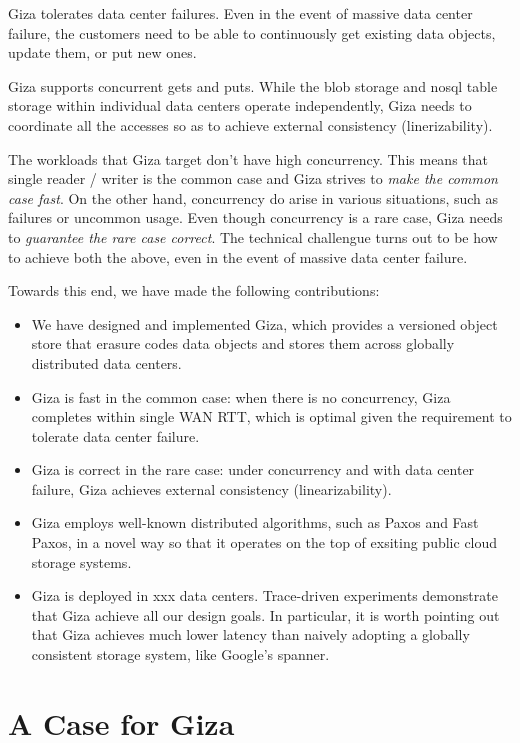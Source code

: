 Giza tolerates data center failures. Even in the event of massive data center failure, the customers need to be able to continuously get existing data objects, update them, or put new ones.

Giza supports concurrent gets and puts. While the blob storage and nosql table storage within individual data centers operate independently, Giza needs to coordinate all the accesses so as to achieve external consistency (linerizability).

The workloads that Giza target don't have high concurrency. This means that single reader / writer is the common case and Giza strives to {\em make the common case fast}. On the other hand, concurrency do arise in various situations, such as failures or uncommon usage. Even though concurrency is a rare case, Giza needs to {\em guarantee the rare case correct}. The technical challengue turns out to be how to achieve both the above, even in the event of massive data center failure.

Towards this end, we have made the following contributions:
\begin{itemize}
    \item We have designed and implemented Giza, which provides a versioned object store that erasure codes data objects and stores them across globally distributed data centers.
    \item Giza is fast in the common case: when there is no concurrency, Giza completes within single WAN RTT, which is optimal given the requirement to tolerate data center failure.
    \item Giza is correct in the rare case: under concurrency and with data center failure, Giza achieves external consistency (linearizability).
    \item Giza employs well-known distributed algorithms, such as Paxos and Fast Paxos, in a novel way so that it operates on the top of exsiting public cloud storage systems.
    \item Giza is deployed in xxx data centers. Trace-driven experiments demonstrate that Giza achieve all our design goals. In particular, it is worth pointing out that Giza achieves much lower latency than naively adopting a globally consistent storage system, like Google's spanner.
\end{itemize}

\section{A Case for Giza}

